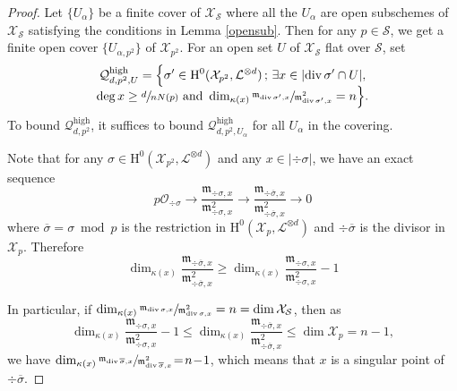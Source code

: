\documentclass[11pt]{article}
\numberwithin{equation}{section}
\newcommand{\sep}{\,;\,}
\theoremstyle{plain}
\theoremstyle{definition}
\newcommand{\ho}{\mathrm{H}}
\newcommand{\m}{\mathfrak{m}}
\newcommand{\X}{\mathcal{X}}
\newcommand{\li}{\mathcal{L}}
\begin{document}
\begin{proof}[Proof]
Let $\{U_{\alpha}\}$ be a finite cover of $\X_{\mathcal{S}}$ where all the $U_{\alpha}$ are open subschemes of $\X_{\mathcal{S}}$ satisfying the conditions in Lemma \ref{opensub}. Then for any $p\in \mathcal{S}$, we get a finite open cover $\{U_{\alpha,p^2}\}$ of $\X_{p^2}$. For an open set $U$ of $\X_{\mathcal{S}}$ flat over $\mathcal{S}$, set
\begin{multline*}
\mathcal{Q}^{\mathrm{high}}_{d,p^2,U}=\Bigl\{ \sigma'\in \ho^0(\X_{p^2}, \li^{\otimes d})\sep \exists x\in |{\div \sigma'\cap U}|,\\[-5pt]\deg x\geq \sfrac{d}{nN(p)} \text{ and } \dim_{\kappa(x)}\sfrac{\m_{\div \sigma',x}}{\m^2_{\div \sigma', x}}=n \Bigr\}.
\end{multline*}
To bound $\mathcal{Q}^{\mathrm{high}}_{d,p^2}$, it suffices to bound $\mathcal{Q}^{\mathrm{high}}_{d,p^2,U_{\alpha}}$ for all $U_{\alpha}$ in the covering.

Note that for any $\sigma\in \ho^0(\X_{p^2}, \li^{\otimes d})$ and any $x\in |{\div\sigma}|$, we have an exact sequence
\[
p\mathcal{O_{\div \sigma}} \to \frac{\m_{\div \sigma,x}}{\m^2_{\div \sigma, x}} \to \frac{\m_{\div \overline{\sigma},x}}{\m^2_{\div \overline{\sigma}, x}} \to 0
\]
where $\overline{\sigma}=\sigma\bmod p$ is the restriction in $\ho^0(\X_{p}, \li^{\otimes d})$ and $\div \overline{\sigma}$ is the divisor in $\X_p$. Therefore
\[
\dim_{\kappa(x)}\frac{\m_{\div \overline{\sigma},x}}{\m^2_{\div \overline{\sigma}, x}} \geq \dim_{\kappa(x)}\frac{\m_{\div \sigma,x}}{\m^2_{\div \sigma, x}}-1
\]

In particular, if $\dim_{\kappa(x)}\sfrac{\m_{\div \sigma,x}}{\m^2_{\div \sigma, x}}=n=\dim \X_{\mathcal{S}}$, then as
\[
\dim_{\kappa(x)}\frac{\m_{\div \sigma,x}}{\m^2_{\div \sigma, x}}-1\leq \dim_{\kappa(x)}\frac{\m_{\div \overline{\sigma},x}}{\m^2_{\div \overline{\sigma}, x}} \leq \dim \X_p=n-1,
\]
we have $ \dim_{\kappa(x)}\sfrac{\m_{\div \overline{\sigma},x}}{\m^2_{\div \overline{\sigma}, x}}\!=\!n\!-\!1$, which means that $x$ is a singular point of~$\div \overline{\sigma}$.


\end{proof}
\end{document}
